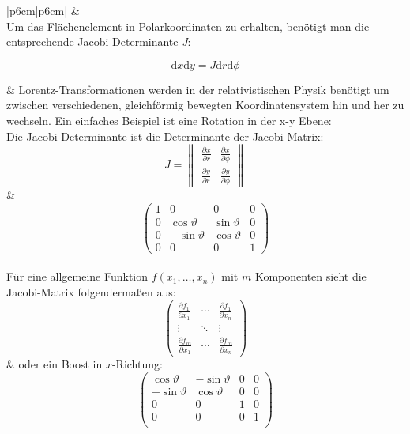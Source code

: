 \documentclass[a4paper, 10pt,onecolumn]{scrartcl}
\begin{document}
\begin{center}
	\begin{tabular}{|p{6cm}|p{6cm}|}
		\hline
		 & \multicolumn{1}{|c|}{Lorentz} \\
		\hline \hline
		Um das Flächenelement in Polarkoordinaten zu erhalten, benötigt man die entsprechende Jacobi-Determinante \textit{J}: 
		\begin{center}
		\[
		\mathrm{d}x\mathrm{d}y=J \mathrm{d}r\mathrm{d}\phi
		\]
		\end{center}
		& 
		Lorentz-Transformationen werden in der relativistischen Physik benötigt um zwischen verschiedenen, gleichförmig bewegten Koordinatensystem hin und her zu wechseln. Ein einfaches Beispiel ist eine Rotation in der x-y Ebene:\\
		Die Jacobi-Determinante ist die Determinante der Jacobi-Matrix:
		\[
		J= 
		\begin{Vmatrix}
		\frac{\partial x}{\partial r} & \frac{\partial x}{\partial \phi}\\
		\frac{\partial y}{\partial r} & \frac{\partial y}{\partial \phi}
		\end{Vmatrix}
		\]
		& 
		\[
		\begin{pmatrix}
			1 & 0 & 0 & 0 \\
			0 & \cos \vartheta & \sin \vartheta & 0 \\
			0 & -\sin\vartheta & \cos \vartheta & 0 \\
			0 & 0 & 0 & 1
		\end{pmatrix}
		\] \\
		Für eine allgemeine Funktion $f(x_1, \dots, x_n)$ mit $m$ Komponenten sieht die Jacobi-Matrix folgendermaßen aus:
		\[
		\begin{pmatrix}
		\frac{\partial f_1}{\partial x_1} & \cdots & \frac{\partial f_1}{\partial x_n} \\
		\vdots & \ddots & \vdots \\
		\frac{\partial f_m}{\partial x_1} & \cdots & \frac{\partial f_m}{\partial x_n}
		\end{pmatrix}
		\] 
		& oder ein Boost in $x$-Richtung:
		\[
		\begin{pmatrix}
			\cos \vartheta & -\sin \vartheta & 0 & 0 \\
			-\sin \vartheta & \cos \vartheta & 0 & 0 \\
			0 & 0 & 1 & 0 \\
			0 & 0 & 0 & 1 \\
		\end{pmatrix}
		\] \\
		\hline
	\end{tabular}
\end{center}
\end{document}

